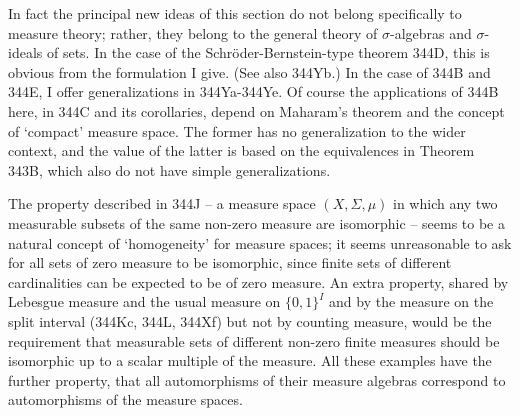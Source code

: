 {In fact the principal new ideas of this section do not belong
specifically to measure theory;  rather, they belong to the general
theory of $\sigma$-algebras and $\sigma$-ideals of sets.   In the case
of the Schr\"oder-Bernstein-type theorem 344D, this is obvious from the
formulation I give.   (See also 344Yb.)   In the case of 344B and 344E,
I offer generalizations in 344Ya-344Ye.   Of course the applications of
344B here, in 344C and its corollaries, depend on Maharam's theorem and
the concept of `compact' measure space.   The former has no
generalization to the wider context, and the value of the latter is
based on the
equivalences in Theorem 343B, which also do not have simple
generalizations.

The property described in 344J -- a measure space
$(X,\Sigma,\mu)$ in which any two measurable subsets of the same
non-zero measure are isomorphic -- seems to be a natural concept of
`homogeneity' for measure spaces;  it seems unreasonable to ask for all
sets of zero measure to be isomorphic, since finite sets of different
cardinalities can be expected to be of zero measure.   An extra
property, shared by Lebesgue measure and the usual measure on
$\{0,1\}^I$ and by the measure on the split interval (344Kc, 344L, 344Xf)
but not by
counting measure, would be the requirement that
measurable sets of different non-zero finite measures should be
isomorphic up
to a scalar multiple of the measure.   All these examples have the
further property, that all automorphisms of their measure algebras
correspond to automorphisms of the measure spaces.
}%


\discrpage

